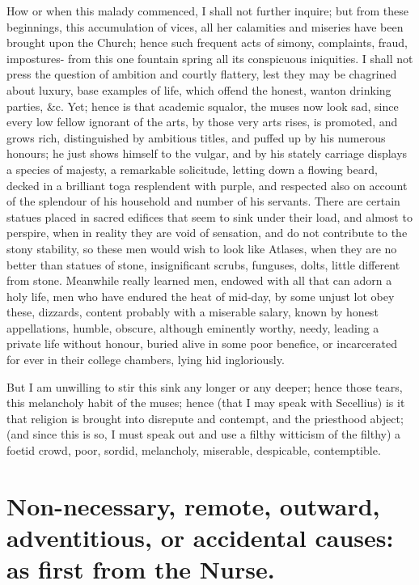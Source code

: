 {{How or when this malady commenced, I shall not further inquire; but from these
beginnings, this accumulation of vices, all her calamities and miseries have
been brought upon the Church; hence such frequent acts of simony, complaints,
fraud, impostures- from this one fountain spring all its conspicuous
iniquities. I shall not press the question of ambition and courtly flattery,
lest they may be chagrined about luxury, base examples of life, which offend
the honest, wanton drinking parties, \&c. Yet; hence is that academic squalor,
the muses now look sad, since every low fellow ignorant of the arts, by those
very arts rises, is promoted, and grows rich, distinguished by ambitious
titles, and puffed up by his numerous honours; he just shows himself to the
vulgar, and by his stately carriage displays a species of majesty, a remarkable
solicitude, letting down a flowing beard, decked in a brilliant toga
resplendent with purple, and respected also on account of the splendour of his
household and number of his servants. There are certain statues placed in
sacred edifices that seem to sink under their load, and almost to perspire,
when in reality they are void of sensation, and do not contribute to the stony
stability, so these men would wish to look like Atlases, when they are no
better than statues of stone, insignificant scrubs, funguses, dolts, little
different from stone. Meanwhile really learned men, endowed with all that can
adorn a holy life, men who have endured the heat of mid-day, by some unjust lot
obey these, dizzards, content probably with a miserable salary, known by honest
appellations, humble, obscure, although eminently worthy, needy, leading a
private life without honour, buried alive in some poor benefice, or
incarcerated for ever in their college chambers, lying hid ingloriously.

But I am unwilling to stir this sink any longer or any deeper; hence those
tears, this melancholy habit of the muses; hence (that I may speak with
Secellius) is it that religion is brought into disrepute and contempt, and the
priesthood abject; (and since this is so, I must speak out and use a filthy
witticism of the filthy) a foetid crowd, poor, sordid, melancholy, miserable,
despicable, contemptible.
}

\section[Remote or accidental causes]{Non-necessary, remote, outward, adventitious, or accidental causes: as first from the Nurse.}

}
